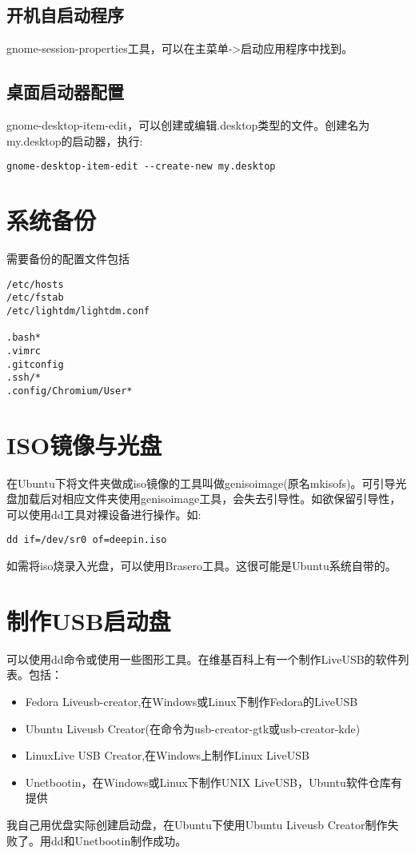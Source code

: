 \subsection{开机自启动程序}
gnome-session-properties工具，可以在主菜单->启动应用程序中找到。

\subsection{桌面启动器配置}
gnome-desktop-item-edit，可以创建或编辑.desktop类型的文件。创建名为my.desktop的启动器，执行:
\begin{verbatim}
gnome-desktop-item-edit --create-new my.desktop
\end{verbatim}










\section{系统备份}
需要备份的配置文件包括


\begin{verbatim}
/etc/hosts
/etc/fstab
/etc/lightdm/lightdm.conf

.bash*
.vimrc
.gitconfig
.ssh/*
.config/Chromium/User*
\end{verbatim}


\section{ISO镜像与光盘}
在Ubuntu下将文件夹做成iso镜像的工具叫做genisoimage(原名mkisofs)。可引导光盘加载后对相应文件夹使用genisoimage工具，会失去引导性。如欲保留引导性，可以使用dd工具对裸设备进行操作。如:

\verb+dd if=/dev/sr0 of=deepin.iso+

如需将iso烧录入光盘，可以使用Brasero工具。这很可能是Ubuntu系统自带的。

\section{制作USB启动盘}
可以使用dd命令或使用一些图形工具。在维基百科上有一个制作LiveUSB的软件列表。包括：
\begin{itemize}
  \item Fedora Liveusb-creator,在Windows或Linux下制作Fedora的LiveUSB
  \item Ubuntu Liveusb Creator(在命令为usb-creator-gtk或usb-creator-kde)
  \item LinuxLive USB Creator,在Windows上制作Linux LiveUSB
  \item Unetbootin，在Windows或Linux下制作UNIX LiveUSB，Ubuntu软件仓库有提供
\end{itemize}
我自己用优盘实际创建启动盘，在Ubuntu下使用Ubuntu Liveusb Creator制作失败了。用dd和Unetbootin制作成功。

